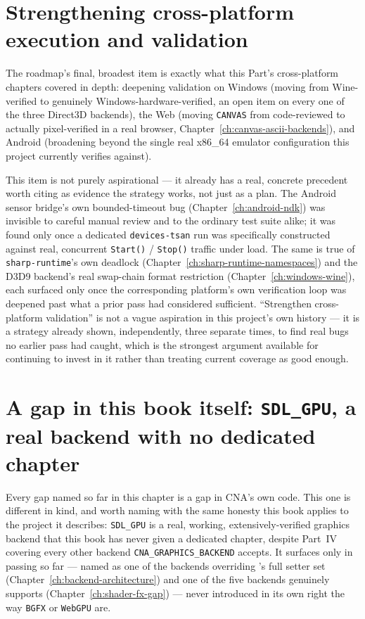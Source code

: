 \section{Strengthening cross-platform execution and validation}

The roadmap's final, broadest item is exactly what this Part's cross-platform chapters
covered in depth: deepening validation on Windows (moving from Wine-verified to genuinely
Windows-hardware-verified, an open item on every one of the three Direct3D backends), the
Web (moving \texttt{CANVAS} from code-reviewed to actually pixel-verified in a real browser,
Chapter~\ref{ch:canvas-ascii-backends}), and Android (broadening beyond the single real
x86\_64 emulator configuration this project currently verifies against).

This item is not purely aspirational --- it already has a real, concrete precedent worth citing
as evidence the strategy works, not just as a plan. The Android sensor bridge's own
bounded-timeout bug (Chapter~\ref{ch:android-ndk}) was invisible to careful manual review and
to the ordinary test suite alike; it was found only once a dedicated \texttt{devices-tsan} run
was specifically constructed against real, concurrent \texttt{Start()} / \texttt{Stop()} traffic
under load. The same is true of \texttt{sharp-runtime}'s own  deadlock
(Chapter~\ref{ch:sharp-runtime-namespaces}) and the D3D9 backend's real swap-chain format restriction
(Chapter~\ref{ch:windows-wine}), each surfaced only once the corresponding platform's own
verification loop was deepened past what a prior pass had considered sufficient. ``Strengthen
cross-platform validation'' is not a vague aspiration in this project's own history --- it is a
strategy already shown, independently, three separate times, to find real bugs no earlier pass
had caught, which is the strongest argument available for continuing to invest in it rather
than treating current coverage as good enough.

\section{A gap in this book itself: \texttt{SDL\_GPU}, a real backend with no dedicated chapter}

Every gap named so far in this chapter is a gap in CNA's own code. This one is different in
kind, and worth naming with the same honesty this book applies to the project it describes:
\texttt{SDL\_GPU} is a real, working, extensively-verified graphics backend that this book has
never given a dedicated chapter, despite Part~IV covering every other backend
\texttt{CNA\_GRAPHICS\_BACKEND} accepts. It surfaces only in passing so far --- named as one of
the backends overriding 's full setter set (Chapter~\ref{ch:backend-architecture})
and one of the five backends  genuinely supports
(Chapter~\ref{ch:shader-fx-gap}) --- never introduced in its own right the way
\texttt{BGFX} or \texttt{WebGPU} are.

